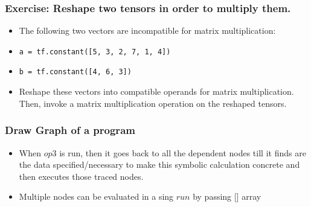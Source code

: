 \begin{frame}[fragile] \frametitle{Exercise: Reshape two tensors in order to multiply them.}
\begin{itemize}
\item The following two vectors are incompatible for matrix multiplication:
\item \lstinline|a = tf.constant([5, 3, 2, 7, 1, 4])|
\item \lstinline|b = tf.constant([4, 6, 3])|
\item Reshape these vectors into compatible operands for matrix multiplication. Then, invoke a matrix multiplication operation on the reshaped tensors.
\end{itemize}

\end{frame}



\begin{frame}[fragile] \frametitle{Draw Graph of a program}

\hfill
{}
\begin{itemize}
\item When $op3$ is run, then it goes back to all the dependent nodes till it finds are the data specified/necessary to make this symbolic calculation concrete and then executes those traced nodes.
\item Multiple nodes can be evaluated in a sing $run$ by passing [] array

\end{itemize}
\end{frame}


